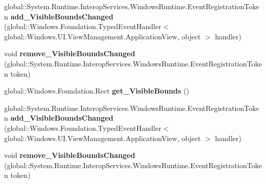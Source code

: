 \begin{DoxyCompactItemize}
\mbox{\label{interface_windows_1_1_u_i_1_1_view_management_1_1_i_application_view2_a6f3dd73ea0a85e796cca56ccc59508ec}} 
global\+::\+System.\+Runtime.\+Interop\+Services.\+Windows\+Runtime.\+Event\+Registration\+Token {\bfseries add\+\_\+\+Visible\+Bounds\+Changed} (global\+::\+Windows.\+Foundation.\+Typed\+Event\+Handler$<$ global\+::\+Windows.\+U\+I.\+View\+Management.\+Application\+View, object $>$ handler)
\item 
\mbox{\label{interface_windows_1_1_u_i_1_1_view_management_1_1_i_application_view2_a6edb35d942013a4377357cc35cbac9fe}} 
void {\bfseries remove\+\_\+\+Visible\+Bounds\+Changed} (global\+::\+System.\+Runtime.\+Interop\+Services.\+Windows\+Runtime.\+Event\+Registration\+Token token)
\item 
\mbox{\label{interface_windows_1_1_u_i_1_1_view_management_1_1_i_application_view2_ad6db037a99c4ceb8e22771d1d3805bba}} 
global\+::\+Windows.\+Foundation.\+Rect {\bfseries get\+\_\+\+Visible\+Bounds} ()
\item 
\mbox{\label{interface_windows_1_1_u_i_1_1_view_management_1_1_i_application_view2_a6f3dd73ea0a85e796cca56ccc59508ec}} 
global\+::\+System.\+Runtime.\+Interop\+Services.\+Windows\+Runtime.\+Event\+Registration\+Token {\bfseries add\+\_\+\+Visible\+Bounds\+Changed} (global\+::\+Windows.\+Foundation.\+Typed\+Event\+Handler$<$ global\+::\+Windows.\+U\+I.\+View\+Management.\+Application\+View, object $>$ handler)
\item 
\mbox{\label{interface_windows_1_1_u_i_1_1_view_management_1_1_i_application_view2_a6edb35d942013a4377357cc35cbac9fe}} 
void {\bfseries remove\+\_\+\+Visible\+Bounds\+Changed} (global\+::\+System.\+Runtime.\+Interop\+Services.\+Windows\+Runtime.\+Event\+Registration\+Token token)
\item 
\mbox{\label{interface_windows_1_1_u_i_1_1_view_management_1_1_i_application_view2_ad6db037a99c4ceb8e22771d1d3805bba}} 

\end{DoxyCompactItemize}
